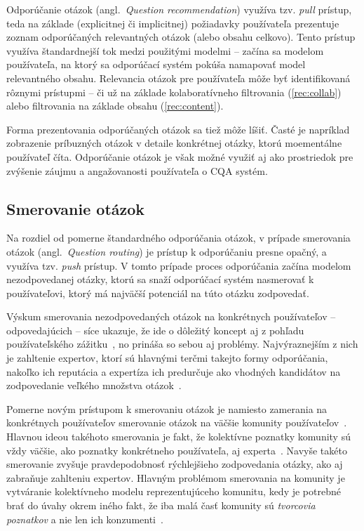 Odporúčanie otázok (angl.~\emph{Question recommendation}) využíva tzv. \emph{pull} prístup, teda na základe (explicitnej
či implicitnej) požiadavky používateľa prezentuje zoznam odporúčaných relevantných otázok (alebo obsahu celkovo).
Tento prístup využíva štandardnejší tok medzi použitými modelmi -- začína sa modelom používateľa, na ktorý sa odporúčací
systém pokúša namapovať model relevantného obsahu.
Relevancia otázok pre používateľa môže byť identifikovaná rôznymi prístupmi -- či už na základe kolaboratívneho
filtrovania (\ref{rec:collab}) alebo filtrovania na základe obsahu (\ref{rec:content}).

Forma prezentovania odporúčaných otázok sa tiež môže líšiť. Časté je napríklad zobrazenie príbuzných otázok v detaile
konkrétnej otázky, ktorú moementálne používateľ číta. Odporúčanie otázok je však možné využiť aj ako prostriedok pre
zvýšenie záujmu a angažovanosti používateľa o CQA systém.


\subsection{Smerovanie otázok}

Na rozdiel od pomerne štandardného odporúčania otázok, v prípade smerovania otázok (angl.~\emph{Question routing})
je prístup k odporúčaniu presne opačný, a využíva tzv. \emph{push} prístup. V tomto prípade proces odporúčania začína
modelom nezodpovedanej otázky, ktorú sa snaží odporúčací systém nasmerovať k používateľovi, ktorý má najväčší potenciál
na túto otázku zodpovedať.

Výskum smerovania nezodpovedaných otázok na konkrétnych používateľov -- odpovedajúcich -- síce ukazuje, že ide o dôležitý
koncept aj z pohľadu používateľského zážitku~\cite{Li2010,Li2011}, no prináša so sebou aj problémy. Najvýraznejším z nich je zahltenie
expertov, ktorí sú hlavnými terčmi takejto formy odporúčania, nakoľko ich reputácia a expertíza ich predurčuje ako vhodných
kandidátov na zodpovedanie veľkého množstva otázok~\cite{Pal2015}.

Pomerne novým prístupom k smerovaniu otázok je namiesto zamerania na konkrétnych používateľov smerovanie otázok na väčšie
komunity používateľov~\cite{Liu2014}. Hlavnou ideou takéhoto smerovania je fakt, že kolektívne poznatky komunity sú vždy väčšie, ako
poznatky konkrétneho používateľa, aj experta~\cite{Pal2013}. Navyše takéto smerovanie zvyšuje pravdepodobnosť rýchlejšieho zodpovedania
otázky, ako aj zabraňuje zahlteniu expertov. Hlavným problémom smerovania na komunity je vytváranie kolektívneho modelu
reprezentujúceho komunitu, kedy je potrebné brať do úvahy okrem iného fakt, že iba malá časť komunity sú \emph{tvorcovia
poznatkov} a nie len ich konzumenti~\cite{Pal2015}.


